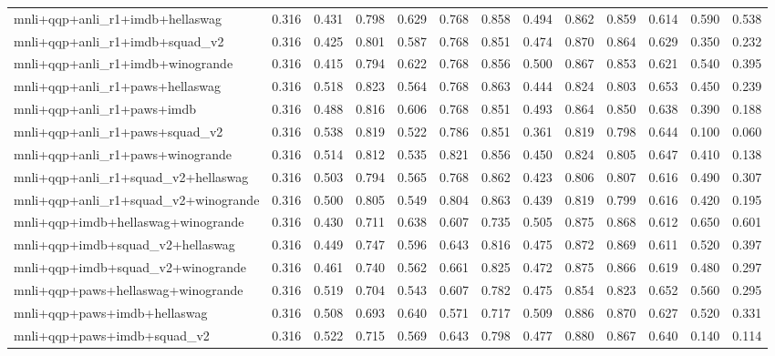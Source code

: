\begin{table}[t]
\begin{tabular}{lrrrrrrrrrrrr}
    mnli+qqp+anli\_r1+imdb+hellaswag & 0.316 & 0.431 & 0.798 & 0.629 & 0.768 & 0.858 & 0.494 & 0.862 & 0.859 & 0.614 & 0.590 & 0.538 \\
    mnli+qqp+anli\_r1+imdb+squad\_v2 & 0.316 & 0.425 & 0.801 & 0.587 & 0.768 & 0.851 & 0.474 & 0.870 & 0.864 & 0.629 & 0.350 & 0.232 \\
    mnli+qqp+anli\_r1+imdb+winogrande & 0.316 & 0.415 & 0.794 & 0.622 & 0.768 & 0.856 & 0.500 & 0.867 & 0.853 & 0.621 & 0.540 & 0.395 \\
    mnli+qqp+anli\_r1+paws+hellaswag & 0.316 & 0.518 & 0.823 & 0.564 & 0.768 & 0.863 & 0.444 & 0.824 & 0.803 & 0.653 & 0.450 & 0.239 \\
    mnli+qqp+anli\_r1+paws+imdb & 0.316 & 0.488 & 0.816 & 0.606 & 0.768 & 0.851 & 0.493 & 0.864 & 0.850 & 0.638 & 0.390 & 0.188 \\
    mnli+qqp+anli\_r1+paws+squad\_v2 & 0.316 & 0.538 & 0.819 & 0.522 & 0.786 & 0.851 & 0.361 & 0.819 & 0.798 & 0.644 & 0.100 & 0.060 \\
    mnli+qqp+anli\_r1+paws+winogrande & 0.316 & 0.514 & 0.812 & 0.535 & 0.821 & 0.856 & 0.450 & 0.824 & 0.805 & 0.647 & 0.410 & 0.138 \\
    mnli+qqp+anli\_r1+squad\_v2+hellaswag & 0.316 & 0.503 & 0.794 & 0.565 & 0.768 & 0.862 & 0.423 & 0.806 & 0.807 & 0.616 & 0.490 & 0.307 \\
    mnli+qqp+anli\_r1+squad\_v2+winogrande & 0.316 & 0.500 & 0.805 & 0.549 & 0.804 & 0.863 & 0.439 & 0.819 & 0.799 & 0.616 & 0.420 & 0.195 \\
    mnli+qqp+imdb+hellaswag+winogrande & 0.316 & 0.430 & 0.711 & 0.638 & 0.607 & 0.735 & 0.505 & 0.875 & 0.868 & 0.612 & 0.650 & 0.601 \\
    mnli+qqp+imdb+squad\_v2+hellaswag & 0.316 & 0.449 & 0.747 & 0.596 & 0.643 & 0.816 & 0.475 & 0.872 & 0.869 & 0.611 & 0.520 & 0.397 \\
    mnli+qqp+imdb+squad\_v2+winogrande & 0.316 & 0.461 & 0.740 & 0.562 & 0.661 & 0.825 & 0.472 & 0.875 & 0.866 & 0.619 & 0.480 & 0.297 \\
    mnli+qqp+paws+hellaswag+winogrande & 0.316 & 0.519 & 0.704 & 0.543 & 0.607 & 0.782 & 0.475 & 0.854 & 0.823 & 0.652 & 0.560 & 0.295 \\
    mnli+qqp+paws+imdb+hellaswag & 0.316 & 0.508 & 0.693 & 0.640 & 0.571 & 0.717 & 0.509 & 0.886 & 0.870 & 0.627 & 0.520 & 0.331 \\
    mnli+qqp+paws+imdb+squad\_v2 & 0.316 & 0.522 & 0.715 & 0.569 & 0.643 & 0.798 & 0.477 & 0.880 & 0.867 & 0.640 & 0.140 & 0.114 \\

\end{tabular}
\end{table}
